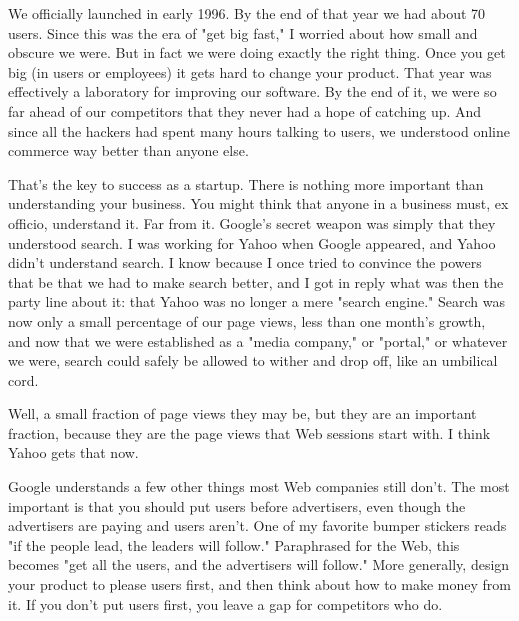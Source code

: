 We officially launched
                    in early 1996. By the end of that year we had about 70
                    users. Since this was the era of "get big fast," I worried
                    about how small and obscure we were. But in fact we were
                    doing exactly the right thing. Once you get big (in users or
                    employees) it gets hard to change your product. That year
                    was effectively a laboratory for improving our software. By
                    the end of it, we were so far ahead of our competitors that
                    they never had a hope of catching up. And since all the
                    hackers had spent many hours talking to users, we understood
                    online commerce way better than anyone else.

That's
                    the key to success as a startup. There is nothing more
                    important than understanding your business. You might think
                    that anyone in a business must, ex officio, understand it.
                    Far from it. Google's secret weapon was simply that they
                    understood search. I was working for Yahoo when Google
                    appeared, and Yahoo didn't understand search. I know because
                    I once tried to convince the powers that be that we had to
                    make search better, and I got in reply what was then the
                    party line about it: that Yahoo was no longer a mere "search
                    engine." Search was now only a small percentage of our page
                    views, less than one month's growth, and now that we were
                    established as a "media company," or "portal," or whatever
                    we were, search could safely be allowed to wither and drop
                    off, like an umbilical cord.

Well, a small
                    fraction of page views they may be, but they are an
                    important fraction, because they are the page views that Web
                    sessions start with. I think Yahoo gets that now.

Google
                    understands a few other things most Web companies still
                    don't. The most important is that you should put users
                    before advertisers, even though the advertisers are paying
                    and users aren't. One of my favorite bumper stickers reads
                    "if the people lead, the leaders will follow." Paraphrased
                    for the Web, this becomes "get all the users, and the
                    advertisers will follow." More generally, design your
                    product to please users first, and then think about how to
                    make money from it. If you don't put users first, you leave
                    a gap for competitors who do.

